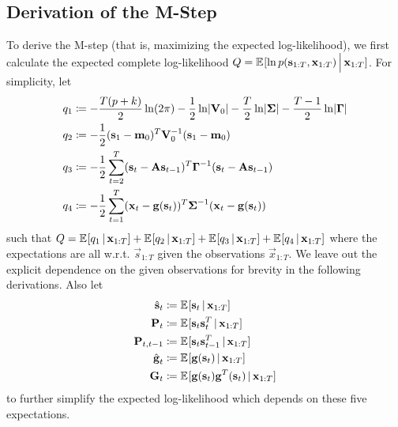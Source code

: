 	\subsection{Derivation of the M-Step}
		To derive the M-step (that is, maximizing the expected log-likelihood), we first calculate the expected complete log-likelihood \( Q = \mathbb{E}_{}[\ln p(\boldsymbol{\mathrm{s}}_{1:T}, \boldsymbol{\mathrm{x}}_{1:T}) \,\Big\vert\, \boldsymbol{\mathrm{x}}_{1:T}] \). For simplicity, let
		\begin{align*}
			q_1 &\coloneqq -\frac{T (p + k)}{2} \ln (2\pi) - \frac{1}{2} \ln \lvert\boldsymbol{\mathrm{V}}_0\rvert - \frac{T}{2} \ln \lvert\boldsymbol{\mathrm{\Sigma}}\rvert - \frac{T - 1}{2} \ln \lvert\boldsymbol{\mathrm{\Gamma}}\rvert \\
			q_2 &\coloneqq -\frac{1}{2} (\boldsymbol{\mathrm{s}}_1 - \boldsymbol{\mathrm{m}}_0)^T \boldsymbol{\mathrm{V}}_0^{-1} (\boldsymbol{\mathrm{s}}_1 - \boldsymbol{\mathrm{m}}_0) \\
			q_3 &\coloneqq -\frac{1}{2} \sum_{t = 2}^{T} (\boldsymbol{\mathrm{s}}_t - \boldsymbol{\mathrm{A}}\boldsymbol{\mathrm{s}}_{t - 1})^T \boldsymbol{\mathrm{\Gamma}}^{-1} (\boldsymbol{\mathrm{s}}_t - \boldsymbol{\mathrm{A}}\boldsymbol{\mathrm{s}}_{t - 1}) \\
			q_4 &\coloneqq -\frac{1}{2} \sum_{t = 1}^{T} (\boldsymbol{\mathrm{x}}_t - \boldsymbol{\mathrm{g}}(\boldsymbol{\mathrm{s}}_t))^T \boldsymbol{\mathrm{\Sigma}}^{-1} (\boldsymbol{\mathrm{x}}_t - \boldsymbol{\mathrm{g}}(\boldsymbol{\mathrm{s}}_t))
		\end{align*}
		such that \( Q = \mathbb{E}_{}[q_1 \,\vert\, \boldsymbol{\mathrm{x}}_{1:T}] + \mathbb{E}_{}[q_2 \,\vert\, \boldsymbol{\mathrm{x}}_{1:T}] + \mathbb{E}_{}[q_3 \,\vert\, \boldsymbol{\mathrm{x}}_{1:T}] + \mathbb{E}_{}[q_4 \,\vert\, \boldsymbol{\mathrm{x}}_{1:T}] \) where the expectations are all w.r.t. \( \vec{s}_{1:T} \) given the observations \( \vec{x}_{1:T} \). We leave out the explicit dependence on the given observations for brevity in the following derivations. Also let
		\begin{align*}
			\hat{\boldsymbol{\mathrm{s}}}_t    & \coloneqq \mathbb{E}_{}[\boldsymbol{\mathrm{s}}_t \,\vert\, \boldsymbol{\mathrm{x}}_{1:T}]                                           \\
			\boldsymbol{\mathrm{P}}_t          & \coloneqq \mathbb{E}_{}[\boldsymbol{\mathrm{s}}_t \boldsymbol{\mathrm{s}}_t^T \,\vert\, \boldsymbol{\mathrm{x}}_{1:T}]                               \\
			\boldsymbol{\mathrm{P}}_{t, t - 1} & \coloneqq \mathbb{E}_{}[\boldsymbol{\mathrm{s}}_t \boldsymbol{\mathrm{s}}_{t - 1}^T \,\vert\, \boldsymbol{\mathrm{x}}_{1:T}]                         \\
			\hat{\boldsymbol{\mathrm{g}}}_t    & \coloneqq \mathbb{E}_{}[\boldsymbol{\mathrm{g}}(\boldsymbol{\mathrm{s}}_t) \,\vert\, \boldsymbol{\mathrm{x}}_{1:T}]                            \\
			\boldsymbol{\mathrm{G}}_t          & \coloneqq \mathbb{E}_{}[\boldsymbol{\mathrm{g}}(\boldsymbol{\mathrm{s}}_t) \boldsymbol{\mathrm{g}}^T(\boldsymbol{\mathrm{s}}_t) \,\vert\, \boldsymbol{\mathrm{x}}_{1:T}]
		\end{align*}
		to further simplify the expected log-likelihood which depends on these five expectations.
		

